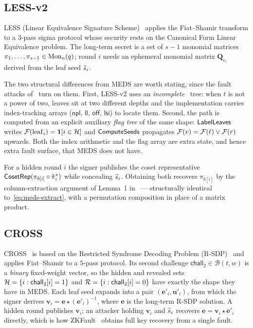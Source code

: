 \subsection{LESS-v2}
\label{sec:less}

LESS (Linear Equivalence Signature Scheme)~\cite{LESS-spec} applies the
Fiat--Shamir transform to a $3$-pass sigma protocol whose security rests on the
Canonical Form Linear Equivalence problem. The long-term secret is a set of
$s-1$ monomial matrices $\pi_1,\ldots,\pi_{s-1} \in \mathrm{Mon}_n(q)$; round $i$ needs
an ephemeral monomial matrix $\mathbf{Q}_{e_i}$ derived from the leaf seed
$\widetilde{s}_i$.

The two structural differences from MEDS are worth stating, since the fault
attacks of~\cite{ZKFault,FaultToForge2025} turn on them. First, LESS-v2 uses an
\emph{incomplete} \GGM\ tree: when $t$ is not a power of two, leaves sit at two
different depths and the implementation carries index-tracking arrays
($\mathsf{npl}$, $\mathsf{ll}$, $\mathsf{off}$, $\mathsf{lsi}$) to locate them.
Second, the path is computed from an explicit auxiliary \emph{flag tree} of the
same shape: $\mathsf{LabelLeaves}$ writes
$\mathcal{F}(\mathrm{leaf}_i) = \mathbf{1}[i \in \mathcal{H}]$ and $\mathsf{ComputeSeeds}$
propagates $\mathcal{F}(v) = \mathcal{F}(\ell) \vee \mathcal{F}(r)$ upwards. Both the index
arithmetic and the flag array are extra state, and hence extra fault surface,
that MEDS does not have.

For a hidden round $i$ the signer publishes the coset representative
$\mathsf{CosetRep}(\pi_{b[i]} \circ \tilde{\pi}^*_i)$ while concealing $\widetilde{s}_i$.
Obtaining both recovers $\pi_{b[i]}$ by the column-extraction argument of
Lemma~1 in~\cite{FaultToForge2025} --- structurally
identical to~\eqref{eq:meds-extract}, with a permutation composition in place
of a matrix product.

\subsection{CROSS}
\label{sec:cross}

CROSS~\cite{CROSSspec} is based on the Restricted Syndrome Decoding Problem
(R-SDP)~\cite{BaldiBPSWW24} and applies Fiat--Shamir to a $5$-pass protocol.
Its second challenge $\mathsf{chall}_2 \in \mathcal{B}(t,w)$ is a
\emph{binary} fixed-weight vector, so the hidden and revealed sets
$\mathcal{H} = \{i : \mathsf{chall}_2[i] = 1\}$ and
$\mathcal{R} = \{i : \mathsf{chall}_2[i] = 0\}$ have exactly the shape they have in
MEDS. Each leaf seed expands into a pair
$(\mathbf{e}'_i, \mathbf{u}'_i)$, from which the signer derives
$\mathbf{v}_i = \mathbf{e} \star (\mathbf{e}'_i)^{-1}$, where $\mathbf{e}$ is
the long-term R-SDP solution. A hidden round publishes $\mathbf{v}_i$; an
attacker holding $\mathbf{v}_i$ and $\widetilde{s}_i$ recovers
$\mathbf{e} = \mathbf{v}_i \star \mathbf{e}'_i$ directly, which is how
ZKFault~\cite{ZKFault} obtains full key recovery from a single fault.

